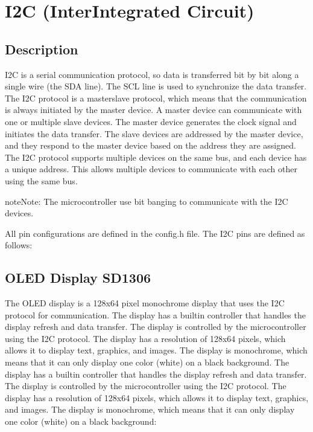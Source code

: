 \documentclass[letterpaper,10pt,english]{sphinxmanual}
\begin{document}
\sphinxstepscope


\chapter{I2C (Inter\sphinxhyphen{}Integrated Circuit)}
\label{\detokenize{i2c:i2c-inter-integrated-circuit}}\label{\detokenize{i2c::doc}}

\section{Description}
\label{\detokenize{i2c:description}}
\sphinxAtStartPar
I2C is a serial communication protocol, so data is transferred bit by bit along a single wire (the SDA line). The SCL line is used to synchronize the data transfer. The I2C protocol is a master\sphinxhyphen{}slave protocol, which means that the communication is always initiated by the master device. A master device can communicate with one or multiple slave devices. The master device generates the clock signal and initiates the data transfer. The slave devices are addressed by the master device, and they respond to the master device based on the address they are assigned. The I2C protocol supports multiple devices on the same bus, and each device has a unique address. This allows multiple devices to communicate with each other using the same bus.

\begin{sphinxadmonition}{note}{Note:}
\sphinxAtStartPar
The microcontroller use bit banging to communicate with the I2C devices.
\end{sphinxadmonition}

\sphinxAtStartPar
All pin configurations are defined in the config.h file. The I2C pins are defined as follows:

\begin{sphinxVerbatim}[commandchars=\\\{\}]
\end{sphinxVerbatim}


\section{OLED Display SD1306}
\label{\detokenize{i2c:oled-display-sd1306}}
\sphinxAtStartPar
The OLED display is a 128x64 pixel monochrome display that uses the I2C protocol for communication. The display has a built\sphinxhyphen{}in controller that handles the display refresh and data transfer. The display is controlled by the microcontroller using the I2C protocol. The display has a resolution of 128x64 pixels, which allows it to display text, graphics, and images. The display is monochrome, which means that it can only display one color (white) on a black background. The display has a built\sphinxhyphen{}in controller that handles the display refresh and data transfer. The display is controlled by the microcontroller using the I2C protocol. The display has a resolution of 128x64 pixels, which allows it to display text, graphics, and images. The display is monochrome, which means that it can only display one color (white) on a black background:
\end{document}
